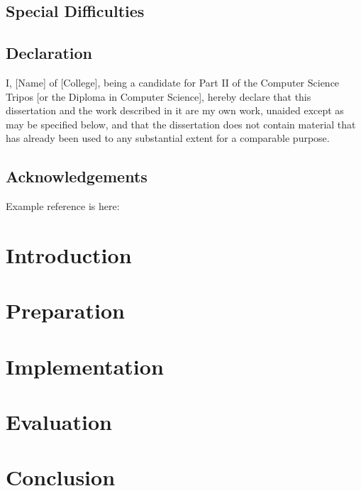 \documentclass[12pt,a4paper,twoside,openright]{report}
\begin{document}
\section*{Special Difficulties}
 
\newpage
\section*{Declaration}

I, [Name] of [College], being a candidate for Part II of the Computer
Science Tripos [or the Diploma in Computer Science], hereby declare
that this dissertation and the work described in it are my own work,
unaided except as may be specified below, and that the dissertation
does not contain material that has already been used to any substantial
extent for a comparable purpose.

\bigskip
{}

\medskip
{}

\tableofcontents

\listoffigures

\newpage
\section*{Acknowledgements}
Example reference is here: \cite{Moore95}


\pagestyle{headings}

\chapter{Introduction}

\chapter{Preparation}

\chapter{Implementation}

\chapter{Evaluation}

\chapter{Conclusion}
\end{document}
